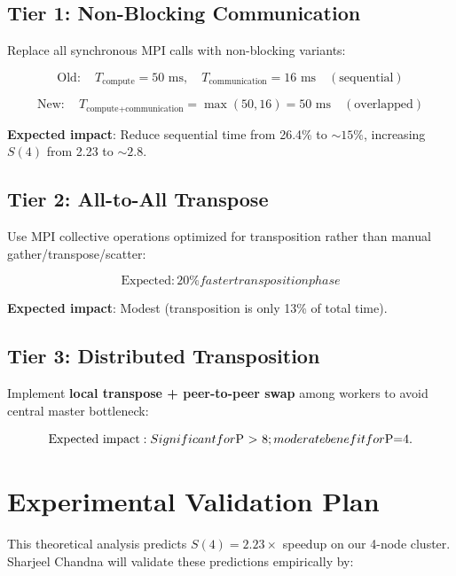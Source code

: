 \documentclass[11pt,a4paper]{article}
\begin{document}
\subsection{Tier 1: Non-Blocking Communication}

Replace all synchronous MPI calls with non-blocking variants:

\[
\text{Old}: \quad T_{\text{compute}} = 50 \text{ ms}, \quad T_{\text{communication}} = 16 \text{ ms} \quad (\text{sequential})
\]

\[
\text{New}: \quad T_{\text{compute+communication}} = \max(50, 16) = 50 \text{ ms} \quad (\text{overlapped})
\]

\textbf{Expected impact}: Reduce sequential time from 26.4\% to $\sim 15\%$, increasing $S(4)$ from 2.23 to $\sim 2.8$.

\subsection{Tier 2: All-to-All Transpose}

Use MPI collective operations optimized for transposition rather than manual gather/transpose/scatter:

\[
\text{Expected}: 20\% faster transposition phase
\]

\textbf{Expected impact}: Modest (transposition is only 13\% of total time).

\subsection{Tier 3: Distributed Transposition}

Implement \textbf{local transpose + peer-to-peer swap} among workers to avoid central master bottleneck:

\[
\text{Expected impact}: Significant for $P > 8$; moderate benefit for $P=4$.
\]

\section{Experimental Validation Plan}

This theoretical analysis predicts $S(4) = 2.23\times$ speedup on our 4-node cluster. Sharjeel Chandna will validate these predictions empirically by:
\end{document}
